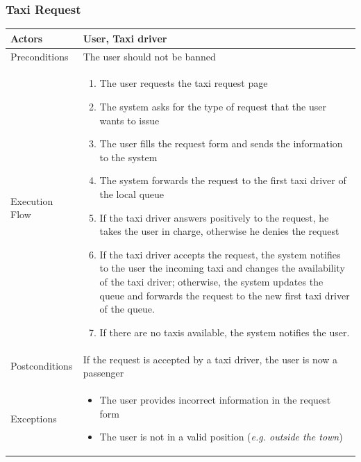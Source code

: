 \documentclass[english]{article}
\providecommand{\tabularnewline}{\\}
\begin{document}
\subsubsection{Taxi Request}

\begin{tabular}{lp{8cm}}
\hline 
Actors  & User, Taxi driver \tabularnewline
\hline 
Preconditions  & The user should not be banned \tabularnewline
\hline 
Execution Flow  & \begin{enumerate}
\item The user requests the taxi request page 
\item The system asks for the type of request that the user wants to issue 
\item The user fills the request form and sends the information to the system 
\item The system forwards the request to the first taxi driver of the local
queue 
\item If the taxi driver answers positively to the request, he takes the
user in charge, otherwise he denies the request 
\item If the taxi driver accepts the request, the system notifies to the
user the incoming taxi and changes the availability of the taxi driver;
otherwise, the system updates the queue and forwards the request to
the new first taxi driver of the queue.
\item If there are no taxis available, the system notifies the user.\end{enumerate}
\tabularnewline
\hline 
Postconditions  & If the request is accepted by a taxi driver, the user is now a passenger \tabularnewline
\hline 
Exceptions  & \begin{itemize}
\item The user provides incorrect information in the request form 
\item The user is not in a valid position (\emph{e.g. outside the town}) \end{itemize}
\tabularnewline
\end{tabular}
\end{document}
